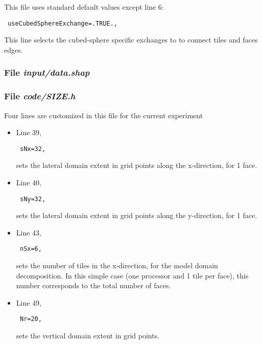 This file uses standard default values except line 6:
\begin{verbatim}
 useCubedSphereExchange=.TRUE.,
\end{verbatim}
This line selects the cubed-sphere specific exchanges to
to connect tiles and faces edges.

\subsubsection{File {\it input/data.shap}}



\subsubsection{File {\it code/SIZE.h}}

Four lines are customized in this file for the current experiment

\begin{itemize}

\item Line 39, 
\begin{verbatim} sNx=32, \end{verbatim}
sets the lateral domain extent in grid points along the x-direction,
for 1 face.

\item Line 40,
\begin{verbatim} sNy=32, \end{verbatim} 
sets the lateral domain extent in grid points along the y-direction,
for 1 face.

\item Line 43,
\begin{verbatim} nSx=6, \end{verbatim} 
sets the number of tiles in the x-direction, for the model domain
decomposition. In this simple case (one processor and 1 tile per 
face), this number corresponds to the total number of faces.

\item Line 49, 
\begin{verbatim} Nr=20,   \end{verbatim} 
sets the vertical domain extent in grid points.

\end{itemize}

%

